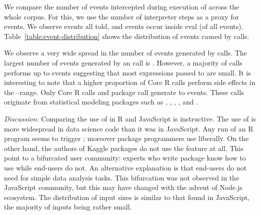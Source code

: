 \documentclass[conference]{IEEEtran}
\begin{document}
We compare the number of events intercepted during execution of \eval across
the whole corpus. For this, we use the number of interpreter steps as a
proxy for events. We observe \AllEventCountRnd events all told, and
\EvalEventCountRnd events occur inside eval (\EvalEventAllPerc of all
events). Table~\ref{table:event-distribution} shows the distribution of
events caused by \eval calls.

\begin{table}[ht] \label{table:event-distribution}
  \caption{Events in \eval calls}
\end{table}

We observe a very wide spread in the number of events generated by \eval
calls. The largest number of events generated by an \eval call is
\EventsMaxCount.  However, a majority of \eval calls performs up to
\EventsMaxRangeA events suggesting that most expressions passed to \eval are
small.  It is interesting to note that a higher proportion of Core R \eval
calls perform side effects in the \EventsMinRangeB--\EventsMaxRangeB range.
Only \EventsCoreEvalCountC Core R \eval calls and \EventsPackageEvalCountC
package \eval call generate \EventsMinRangeC to \EventsMaxRangeC events.
These \eval calls originate from statistical modeling packages such as
\mlogit, \mboost, \metafor, \lavaan, \mclust and \gamlss.


\medskip\noindent\emph{Discussion:} Comparing the use of \eval in R and
JavaScript is instructive. The use of \eval is more widespread in data
science code than it was in JavaScript. Any run of an R program seems to
trigger \eval; moreover package programmers use \eval liberally. On the
other hand, the authors of Kaggle packages do not use the feature at all.
This point to a bifurcated user community: experts who write package know
how to use \eval while end-users do not. An alternative explanation is that
end-users do not need \eval for simple data analysis tasks. This bifurcation
was not observed in the JavaScript community, but this may have changed with
the advent of Node.js ecosystem.  The distribution of input sizes is similar
to that found in JavaScript, the majority of inputs being rather small.
\end{document}
